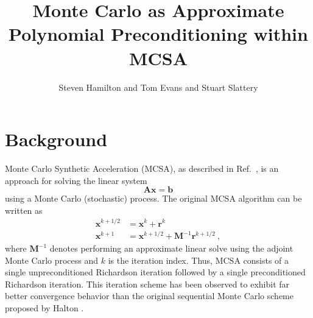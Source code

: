 \documentclass[10pt]{article}
\title{Monte Carlo as Approximate Polynomial Preconditioning within MCSA}
\author{Steven Hamilton and Tom Evans and Stuart Slattery}
\newcommand{\bx}{\ensuremath{\mathbf{x}}}
\newcommand{\bb}{\ensuremath{\mathbf{b}}}
\newcommand{\br}{\ensuremath{\mathbf{r}}}
\newcommand{\bA}{\ensuremath{\mathbf{A}}}
\newcommand{\bM}{\ensuremath{\mathbf{M}}}
\begin{document}
\maketitle

\section{Background}
\label{sec:background}

Monte Carlo Synthetic Acceleration (MCSA), as described in Ref.~\cite{evans_13},
is an approach for solving the linear system
\begin{equation}
\bA \bx = \bb \label{eq:lin_problem}
\end{equation}
using a Monte Carlo (stochastic) process.
The original MCSA algorithm can be written as
\begin{equation}
\begin{aligned}
\bx^{k+1/2} &= \bx^{k} + \br^{k} \\
\bx^{k+1} &= \bx^{k+1/2} + \bM^{-1}\br^{k+1/2} \:,
\end{aligned}
\end{equation}
where $\bM^{-1}$ denotes performing an approximate linear solve using the
adjoint Monte Carlo process and $k$ is the iteration index.
Thus, MCSA consists of a single unpreconditioned
Richardson iteration followed by a single preconditioned Richardson iteration.
This iteration scheme has been observed to exhibit far better convergence
behavior than the original sequential Monte Carlo scheme proposed by Halton \cite{halton_94}.
\end{document}
